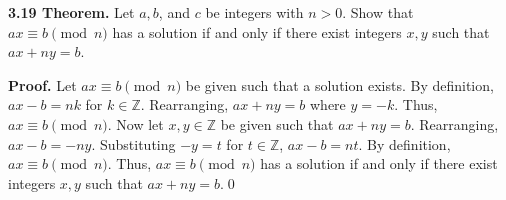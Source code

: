 \documentclass[12pt]{article}
\begin{document}
\noindent\textbf{3.19 Theorem.} Let $a,b$, and $c$ be integers with $n>0$. Show that $ax\equiv b\pmod n$ has a solution if and only if there exist integers $x,y$ such that $ax+ny=b$.

\bigskip

\noindent\textbf{Proof.} Let $ax\equiv b\pmod n$ be given such that a solution exists. By definition, $ax-b=nk$ for $k\in\mathbb{Z}$. Rearranging, $ax+ny=b$ where $y=-k$. Thus, $ax\equiv b\pmod n$. Now let $x,y\in\mathbb{Z}$ be given such that $ax+ny=b$. Rearranging, $ax-b=-ny$. Substituting $-y=t$ for $t\in\mathbb{Z}$, $ax-b=nt$. By definition, $ax\equiv b \pmod n$. Thus, $ax\equiv b\pmod n$ has a solution if and only if there exist integers $x,y$ such that $ax+ny=b$.\qed
\end{document}
